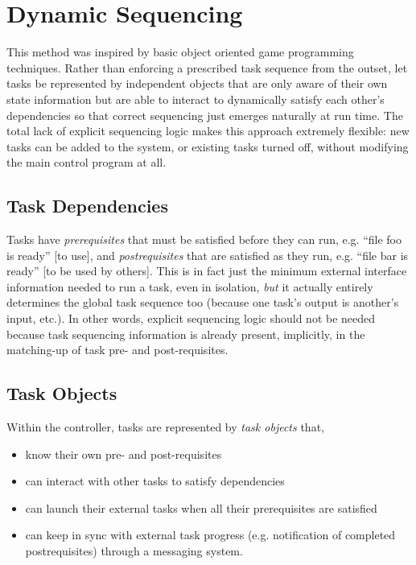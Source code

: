 \documentclass[12pt]{article}
\begin{document}
\section{Dynamic Sequencing}

This method was inspired by basic object oriented game programming
techniques. Rather than enforcing a prescribed task sequence from the
outset, let tasks be represented by independent objects that are only
aware of their own state information but are able to interact to
dynamically satisfy each other's dependencies so that correct sequencing
just emerges naturally at run time. The total lack of explicit
sequencing logic makes this approach extremely flexible: new tasks can
be added to the system, or existing tasks turned off, without modifying
the main control program at all.


\subsection{Task Dependencies}

Tasks have {\em prerequisites} that must be satisfied before they can
run, e.g. ``file foo is ready'' [to use], and {\em postrequisites} that
are satisfied as they run, e.g. ``file bar is ready'' [to be used by
others]. This is in fact just the minimum external interface information
needed to run a task, even in isolation, {\em but} it actually entirely
determines the global task sequence too (because one task's output is
another's input, etc.).  In other words, explicit sequencing logic
should not be needed because task sequencing information is already
present, implicitly, in the matching-up of task pre- and
post-requisites. 

\subsection{Task Objects}

Within the controller, tasks are represented by {\em task objects} that,
\begin{itemize}
\item know their own pre- and post-requisites
\item can interact with other tasks to satisfy dependencies
\item can launch their external tasks when all their prerequisites are
satisfied 
\item can keep in sync with external task progress (e.g. notification of
completed postrequisites) through a messaging system. 
\end{itemize}
\end{document}
